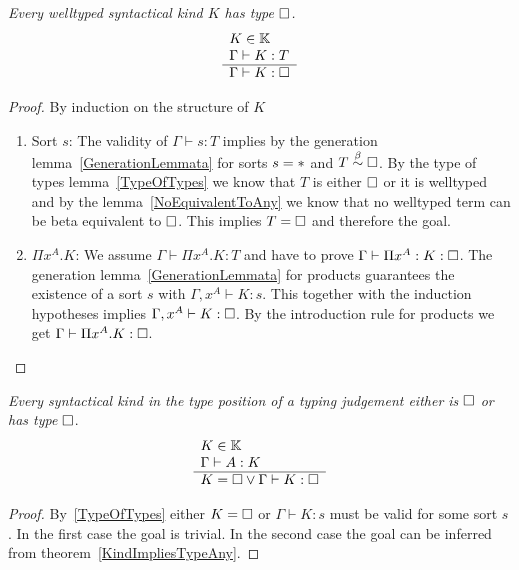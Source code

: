 \begin{theorem}
    \label{KindImpliesTypeAny}
    \emph{Every welltyped syntactical kind $K$ has type $\Box$.}
    $$
    \begin{array}{l} 
        K \in \mathbb{K}
        \\
        \Gamma \vdash K : T
     \\ \hline 
        \Gamma \vdash K: \Box
    \end{array}
    $$
    \begin{proof}
        By induction on the structure of $K$
        \begin{enumerate}
        \item Sort $s$: The validity of $\Gamma \vdash s: T$ implies by the
            generation lemma~\ref{GenerationLemmata} for sorts $s = *$ and
                $T \stackrel{\beta}{\sim} \Box$. By the type of types lemma~\ref{TypeOfTypes}
                we know that $T$ is either $\Box$ or it is welltyped and by the
                lemma~\ref{NoEquivalentToAny} we know that no welltyped term can
                be beta equivalent to $\Box$. This implies $T = \Box$ and
                therefore the goal.

        \item $\Pi x^A. K$: We assume $\Gamma \vdash \Pi x^A.K : T$ and have to
            prove $\Gamma \vdash \Pi x^A: K : \Box$. The generation
                lemma~\ref{GenerationLemmata} for products guarantees the
                existence of a sort $s$ with $\Gamma, x^A \vdash K: s$. This
                together with the induction hypotheses implies $\Gamma, x^A
                \vdash K: \Box$. By
                the introduction rule for products we get $\Gamma \vdash \Pi
                x^A. K : \Box$.
        \end{enumerate}
    \end{proof}
\end{theorem}




\begin{theorem}
    \label{KindImpliesTypeAny2}
    \emph{Every syntactical kind in the type position of a typing judgement
    either is $\Box$ or has type $\Box$}.
    $$
    \begin{array}{l} 
        K \in \mathbb{K}
        \\
        \Gamma \vdash A: K
     \\ \hline 
        K = \Box \lor \Gamma \vdash K: \Box
    \end{array}
    $$
    \begin{proof}
        By~\ref{TypeOfTypes} either $K = \Box$ or $\Gamma \vdash K : s$ must be
        valid for some sort $s$. In the first case the goal is trivial. In the
        second case the goal can be inferred from
        theorem~\ref{KindImpliesTypeAny}.
    \end{proof}
\end{theorem}

